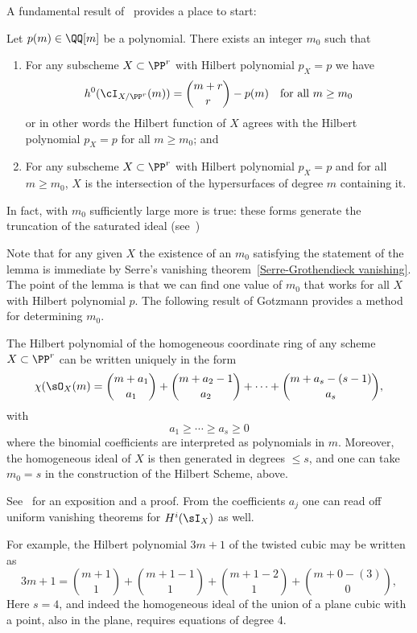 A fundamental result of~\cite{Matsusaka} provides a place to start:

\begin{lemma}\label{matsusaka}
Let $p(m) \in \QQ[m]$ be a polynomial. There exists an integer $m_0$ such that

\begin{enumerate}  

\item For any subscheme $X \subset \PP^r$ with Hilbert polynomial $p_X = p$ we have
$$
h^0(\cI_{X/\PP^r}(m)) = \binom{m+r}{r} - p(m) \quad \text{for all } m \geq m_0
$$
or in other words the Hilbert function of $X$ agrees with the Hilbert polynomial $p_X = p$ for all $m \geq m_0$; and

\item For any subscheme $X \subset \PP^r$ with Hilbert polynomial $p_X = p$ and for all $m \geq m_0$, $X$ is the intersection of the hypersurfaces of degree $m$ containing it.
\end{enumerate}
\end{lemma}

In fact, with $m_0$ sufficiently large more is true:  these forms generate the truncation of the saturated ideal (see~\cite{Gotzmann})

Note that  for any given $X$ the existence of an $m_0$ satisfying the statement of the lemma is immediate by Serre's vanishing theorem~\ref{Serre-Grothendieck vanishing}. The point of the lemma is that we can find one value of $m_0$ that works for all $X$ with Hilbert polynomial $p$. The following result of Gotzmann provides a method for determining $m_0$. 

\begin{theorem}
The Hilbert polynomial  of the homogeneous coordinate ring of any scheme $X\subset \PP^r$ can be written uniquely in the form
$$
\chi(\sO_X(m) = {m+a_1\choose a_1}+ {m+a_2 -1\choose a_2}+ \cdots+{m+a_s -(s-1)\choose a_s},
$$
with 
$$
a_1\geq \cdots \geq a_s \geq 0
$$
where the binomial coefficients are interpreted as polynomials in $m$. Moreover, the homogeneous ideal of $X$ is
then generated in degrees $\leq s$, and one can take $m_0 = s$ in the construction of the Hilbert Scheme, above.
\end{theorem}
See~\cite{MR1023391} %
for an exposition and a proof. From the coefficients $a_j$ one can read off uniform vanishing theorems for $H^i(\sI_X)$
 as well.
 
 For example, the Hilbert polynomial $3m+1$ of the twisted cubic may be written as
 $$
 3m+1 =  {m+1\choose 1}+ {m+1 -1\choose 1}+{m+1 -2\choose 1}+{m+0 -(3)\choose 0},
 $$
 Here $s=4$, and indeed the homogeneous ideal of the union of a plane cubic with a point, also in the plane,
 requires equations of degree 4.
 
